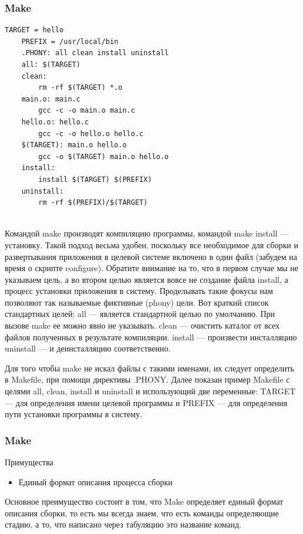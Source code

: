 \documentclass{../industrial-development}
\begin{document}
\begin{frame}[fragile] \frametitle{Make}
	\begin{lstlisting}[label=some-code,caption=Пример makefile]
	TARGET = hello
	PREFIX = /usr/local/bin
	.PHONY: all clean install uninstall
	all: $(TARGET)
	clean:
		rm -rf $(TARGET) *.o
	main.o: main.c
		gcc -c -o main.o main.c
	hello.o: hello.c
		gcc -c -o hello.o hello.c
	$(TARGET): main.o hello.o
		gcc -o $(TARGET) main.o hello.o
	install:
		install $(TARGET) $(PREFIX)
	uninstall:
		rm -rf $(PREFIX)/$(TARGET)
	
	\end{lstlisting}
\end{frame}

\lecturenotes
Командой make производят компиляцию программы, командой make install — установку. Такой подход весьма удобен, поскольку все необходимое для сборки и развертывания приложения в целевой системе включено в один файл (забудем на время о скрипте configure). Обратите внимание на то, что в первом случае мы не указываем цель, а во втором целью является вовсе не создание файла install, а процесс установки приложения в систему. Проделывать такие фокусы нам позволяют так называемые фиктивные (phony) цели. Вот краткий список стандартных целей:
all — является стандартной целью по умолчанию. При вызове make ее можно явно не указывать.
clean — очистить каталог от всех файлов полученных в результате компиляции.
install — произвести инсталляцию
uninstall — и деинсталляцию соответственно.

Для того чтобы make не искал файлы с такими именами, их следует определить в Makefile, при помощи директивы .PHONY. Далее показан пример Makefile с целями all, clean, install и uninstall и использующий две переменные: TARGET — для определения имени целевой программы и PREFIX — для определения пути установки программы в систему.
~\cite{Yandex_Build_Automation}

\begin{frame} \frametitle{Make}
	\begin{block}{Примущества}
		\begin{itemize}
			\item Единый формат описания процесса сборки
		\end{itemize}
	\end{block}
\end{frame}

\lecturenotes
Основное преимущество состоит в том, что Make определяет единый формат описания
сборки, то есть мы всегда знаем, что есть команды определяющие стадию, а то, что написано через табуляцию это название команд.
~\cite{Yandex_Build_Automation}
\end{document}
